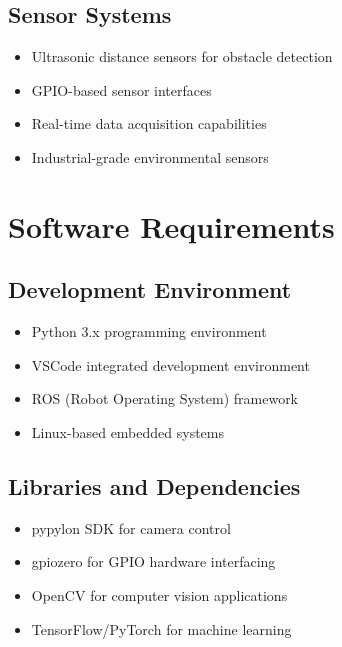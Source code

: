 \documentclass{book}
\begin{document}
\begin{appendices}
\subsection{Sensor Systems}
\begin{itemize}
\item Ultrasonic distance sensors for obstacle detection
\item GPIO-based sensor interfaces
\item Real-time data acquisition capabilities
\item Industrial-grade environmental sensors
\end{itemize}

\section{Software Requirements}

\subsection{Development Environment}
\begin{itemize}
\item Python 3.x programming environment
\item VSCode integrated development environment
\item ROS (Robot Operating System) framework
\item Linux-based embedded systems
\end{itemize}

\subsection{Libraries and Dependencies}
\begin{itemize}
\item pypylon SDK for camera control
\item gpiozero for GPIO hardware interfacing
\item OpenCV for computer vision applications
\item TensorFlow/PyTorch for machine learning
\end{itemize}

\end{appendices}
\end{document}
